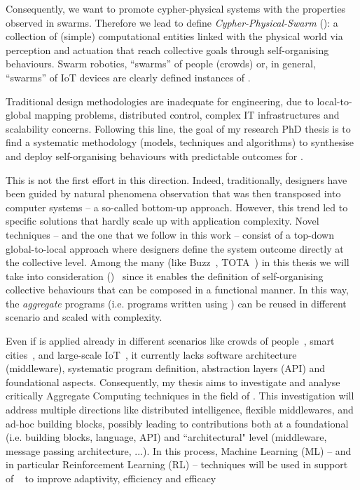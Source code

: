 \documentclass[11pt]{article}
\begin{document}
Consequently, we want to promote cypher-physical systems with the properties observed in swarms. 
%
Therefore we lead to define \textit{Cypher-Physical-Swarm} (\cpsw{}): a collection of (simple) computational entities linked with the physical world via perception and actuation that reach collective goals through self-organising behaviours.
%
Swarm robotics, ``swarms” of people (crowds) or, in general, ``swarms” of IoT devices are clearly defined instances of \cpsw{}.

Traditional design methodologies are inadequate for \cpsw{} engineering, due to local-to-global mapping problems, distributed control, complex IT infrastructures and scalability concerns.
%
Following this line, the goal of my research PhD thesis is to find a systematic methodology (models, techniques and algorithms) to synthesise and deploy self-organising behaviours with predictable outcomes for \cpsw{}.

This is not the first effort in this direction. Indeed, traditionally, designers have been guided
by natural phenomena observation that was then transposed into computer systems -- a so-called
bottom-up approach. However, this trend led to specific solutions that hardly scale up with application complexity.
%
Novel techniques -- and the one that we follow in this work -- consist of a top-down global-to-local approach where designers define the system outcome directly at the collective level.
%
Among the many (like Buzz~\cite{DBLP:journals/software/PinciroliB16}, TOTA~\cite{DBLP:conf/icdcsw/MameiZL03}) in this thesis we will take into consideration \textit{\acfull{}} (\ac{})~\cite{DBLP:journals/computer/BealPV15} since it enables the definition of self-organising collective behaviours that can be composed in a functional manner. In this way, the \textit{aggregate} programs (i.e. programs written using \ac{}) can be reused in different scenario and scaled with complexity. 

Even if \ac{} is applied already in different scenarios like crowds of people~\cite{DBLP:journals/computer/BealPV15}, smart cities~\cite{DBLP:journals/isci/CasadeiFPRSV19}, and large-scale IoT~\cite{DBLP:journals/fgcs/CasadeiFPRSV19}, it currently lacks software architecture (middleware), systematic program definition, abstraction layers (API) and foundational aspects.
%
Consequently, my thesis aims to investigate and analyse critically Aggregate
Computing techniques in the field of \cpsw{}. 
%
This investigation will address multiple directions like distributed intelligence, flexible middlewares, and ad-hoc building blocks, possibly leading to contributions both at a foundational (i.e. building blocks, \ac{} language, API) and ``architectural" level (middleware, message passing architecture, ...).
%
In this process, Machine Learning (ML) -- and in particular Reinforcement Learning (RL) -- techniques will be used in support of \acfull{}~\cite{research} to improve adaptivity, efficiency and efficacy
\end{document}
